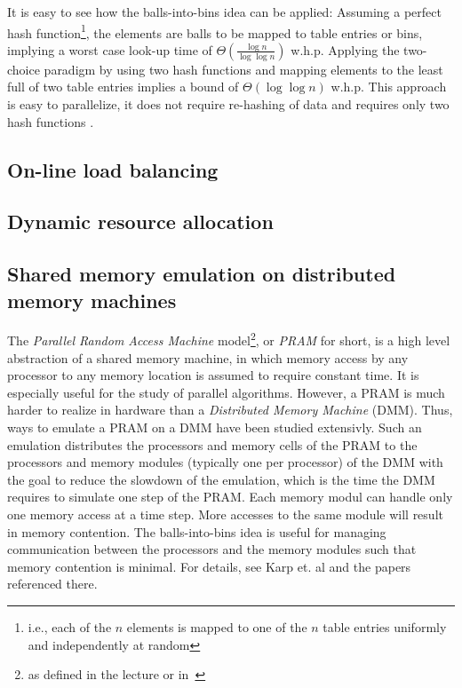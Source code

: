 \documentclass{acm_proc_article-sp}
\begin{document}
It is easy to see how the balls-into-bins idea can be applied: Assuming a perfect hash function\footnote{i.e., each of the $n$ elements is mapped to one of the $n$ table entries uniformly and independently at random}, the elements are balls to be mapped to table entries or bins, implying a worst case look-up time of $\Theta\left(\frac{\log n}{\log \log n}\right)$ w.h.p. Applying the two-choice paradigm by using two hash functions and mapping elements to the least full of two table entries implies a bound of $\Theta\left(\log \log n\right)$ w.h.p. This approach is easy to parallelize, it does not require re-hashing of data and requires only two hash functions \cite{MRS01} \cite{ABKU99}.

\subsection{On-line load balancing}


\subsection{Dynamic resource allocation}

\subsection{Shared memory emulation on distributed memory machines}
The \emph{Parallel Random Access Machine} model\footnote{as defined in the lecture or in~\cite{P03}}, or \emph{PRAM} for short, is a high level abstraction of a shared memory machine, in which memory access by any processor to any memory location is assumed to require constant time. It is especially useful for the study of parallel algorithms. However, a PRAM is much harder to realize in hardware than a \emph{Distributed Memory Machine} (DMM). Thus, ways to emulate a PRAM on a DMM have been studied extensivly. Such an emulation distributes the processors and memory cells of the PRAM to the processors and memory modules (typically one per processor) of the DMM with the goal to reduce the slowdown of the emulation, which is the time the DMM requires to simulate one step of the PRAM. Each memory modul can handle only one memory access at a time step. More accesses to the same module will result in memory contention. The balls-into-bins idea is useful for managing communication between the processors and the memory modules such that memory contention is minimal. For details, see Karp et. al \cite{KLM92} and the papers referenced there. 
 
\end{document}
